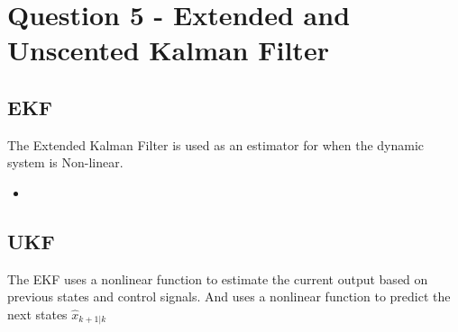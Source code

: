 \chapter{Question 5 - Extended and Unscented Kalman Filter}

\section*{EKF}
The Extended Kalman Filter is used as an estimator for when the dynamic system is Non-linear.
\begin{itemize}
        \item 
\end{itemize}

\section*{UKF}

The EKF uses a nonlinear function to estimate the current output based on previous states and control signals. And uses a nonlinear function to predict the next states $\hat{x}_{k+1 \vert k}$
